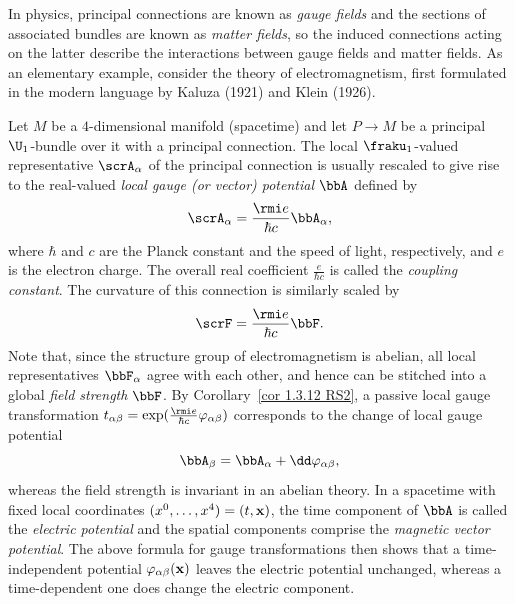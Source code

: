\begin{example}
    In physics, principal connections are known as \emph{gauge fields} and the sections of associated bundles are known as \emph{matter fields}, so the induced connections acting on the latter describe the interactions between gauge fields and matter fields. As an elementary example, consider the theory of electromagnetism, first formulated in the modern language by Kaluza (1921) and Klein (1926). 
    
    Let $M$ be a $4$-dimensional manifold (spacetime) and let $P\to M$ be a principal $\U_1$-bundle over it with a principal connection. The local $\fraku_1$-valued representative $\scrA_\alpha$ of the principal connection is usually rescaled to give rise to the real-valued \emph{local gauge (or vector) potential} $\bbA$ defined by
    \[\scrA_\alpha= \frac{\rmi e}{\hbar c}\bbA_\alpha,\]
    where $\hbar$ and $c$ are the Planck constant and the speed of light, respectively, and $e$ is the electron charge. The overall real coefficient $\frac{e}{\hbar c}$ is called the \emph{coupling constant}. The curvature of this connection is similarly scaled by 
    \[\scrF=\frac{\rmi e}{\hbar c} \bbF.\]
    Note that, since the structure group of electromagnetism is abelian, all local representatives $\bbF_\alpha$ agree with each other, and hence can be stitched into a global \emph{field strength} $\bbF$. By Corollary~\ref{cor 1.3.12 RS2}, a passive local gauge transformation $t_{\alpha\beta}=\exp(\frac{\rmi e}{\hbar c}\varphi_{\alpha\beta})$ corresponds to the change of local gauge potential \[\bbA_\beta=\bbA_\alpha+\dd\varphi_{\alpha\beta},\]
    whereas the field strength is invariant in an abelian theory. In a spacetime with fixed local coordinates $(x^0,\ldots,x^4)=(t,\bf{x})$, the time component of $\bbA$ is called the \emph{electric potential} and the spatial components comprise the \emph{magnetic vector potential}. The above formula for gauge transformations then shows that a time-independent potential $\varphi_{\alpha\beta}(\bf{x})$ leaves the electric potential unchanged, whereas a time-dependent one does change the electric component.



\end{example}
